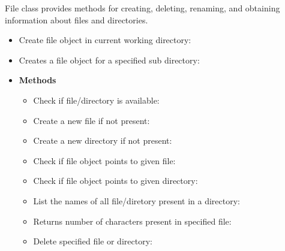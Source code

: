 \setlength{\columnsep}{3pt}
\begin{flushleft}
		File class provides methods for creating, deleting, renaming, and obtaining information about files and directories. 
		\begin{itemize}
			\item Create file object in current working directory:
			\bigskip
			
			\item Creates a file object for a specified sub directory:
		\item \textbf{Methods}
		
		\begin{itemize}
			\item Check if file/directory is available:
			\bigskip
		
			\item Create a new file if not present:
			\bigskip
			
			\item Create a new directory if not present:
			\bigskip
			
			\item Check if file object points to given file:
			\bigskip
			
			\item Check if file object points to given directory:
			\bigskip
		
			\item List the names of all file/diretory present in a directory:
			\bigskip
		
			\item Returns number of characters present in specified file:
			\bigskip
		
			\item Delete specified file or directory:
			\bigskip
			
		\end{itemize}
	
		\end{itemize}
		

\end{flushleft}
